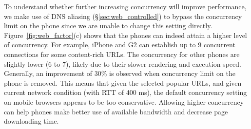 To understand whether further increasing concurrency will improve 
performance, we make use of DNS aliasing 
(\S\ref{sec:web_controlled}) to bypass the concurrency limit on 
the phone since we are unable to change this setting directly.
Figure~\ref{fig:web_factor}(c) shows that the phones can indeed
attain a higher level of concurrency. For example, iPhone and G2 
can establish up to 9 concurrent connections for some content-rich 
URLs. The concurrency for other phones are slightly lower (6 to 7), 
likely due to their slower rendering and execution speed.
Generally, an improvement of 30\% is observed when concurrency limit
on the phone is removed.
This means that given the selected popular URLs, and given 
current network condition (with RTT of 400 ms), the default
concurrency setting on mobile browsers appears to be too
conservative. Allowing higher concurrency can help phones
make better use of available bandwidth and decrease page downloading time.



